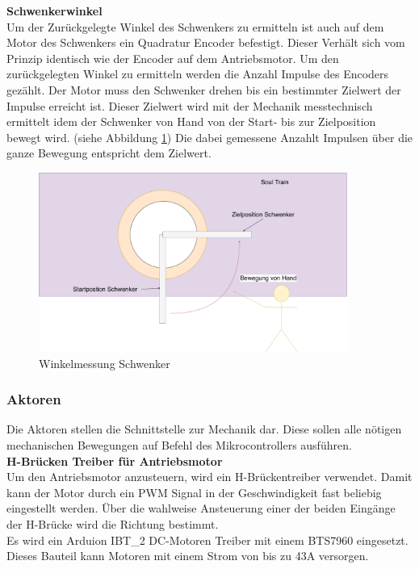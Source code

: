 \documentclass[../../main.tex]{subfiles}
\begin{document}
    \textbf{Schwenkerwinkel}\\
    Um der Zurückgelegte Winkel des Schwenkers zu ermitteln ist auch auf dem Motor des Schwenkers ein Quadratur Encoder befestigt. Dieser Verhält sich vom Prinzip identisch wie der Encoder auf dem Antriebsmotor. Um den zurückgelegten Winkel zu ermitteln werden die Anzahl Impulse des Encoders gezählt. Der Motor muss den Schwenker drehen bis ein bestimmter Zielwert der Impulse erreicht ist. Dieser Zielwert wird mit der Mechanik messtechnisch ermittelt idem der Schwenker von Hand von der Start- bis zur Zielposition bewegt wird. (siehe Abbildung \ref{fig:et_schwenker_messung}) Die dabei gemessene Anzahlt Impulsen über die ganze Bewegung entspricht dem Zielwert.

    \begin{figure}[H]
        \centering
        \includegraphics[width=0.9\textwidth]{../../images/et/et_schwenker_messung.pdf}
        \caption {Winkelmessung Schwenker}
        \label{fig:et_schwenker_messung}
    \end{figure}

    \subsubsection{Aktoren} \label{et_aktoren}
    Die Aktoren stellen die Schnittstelle zur Mechanik dar. Diese sollen alle nötigen mechanischen Bewegungen auf Befehl des Mikrocontrollers ausführen.\\

    \textbf{H-Brücken Treiber für Antriebsmotor}\\
    Um den Antriebsmotor anzusteuern, wird ein H-Brückentreiber verwendet. Damit kann der Motor durch ein PWM Signal in der Geschwindigkeit fast beliebig eingestellt werden. Über die wahlweise Ansteuerung einer der beiden Eingänge der H-Brücke wird die Richtung bestimmt.\\
    Es wird ein Arduion IBT\_2 DC-Motoren Treiber mit einem BTS7960 eingesetzt. Dieses Bauteil kann Motoren mit einem Strom von bis zu 43A versorgen. \\
\end{document}

